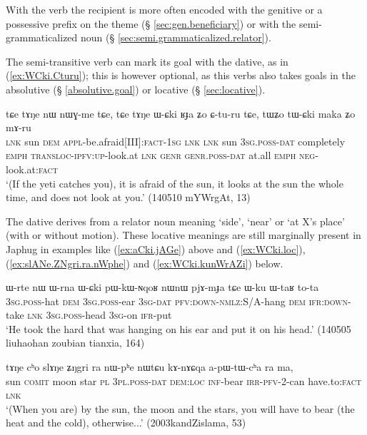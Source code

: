 With the verb  the recipient is more often encoded with the genitive or a possessive prefix on the theme (§ \ref{sec:gen.beneficiary}) or with the semi-grammaticalized noun  (§ \ref{sec:semi.grammaticalized.relator}).

 
The semi-transitive verb  can mark its goal with the dative, as in (\ref{ex:WCki.Cturu}); this is however optional, as this verbs also takes goals in the absolutive (§ \ref{absolutive.goal}) or locative (§ \ref{sec:locative}).

\begin{exe}
\ex \label{ex:WCki.Cturu}
\gll tɕe tɤŋe nɯ nɯɣ-me tɕe, tɕe tɤŋe ɯ-ɕki ʁɟa ʑo ɕ-tu-ru tɕe, tɯʑo tɯ-ɕki maka ʑo mɤ-ru \\
\textsc{lnk} sun \textsc{dem} \textsc{appl}-be.afraid[III]:\textsc{fact}-\textsc{1sg} \textsc{lnk} \textsc{lnk} sun \textsc{3sg}.\textsc{poss}-\textsc{dat} completely \textsc{emph} \textsc{transloc}-\textsc{ipfv}:\textsc{up}-look.at \textsc{lnk} \textsc{genr} \textsc{genr}.\textsc{poss}-\textsc{dat} at.all \textsc{emph} \textsc{neg}-look.at:\textsc{fact} \\
\glt `(If the yeti catches you), it is afraid of the sun, it looks at the sun the whole time, and does not look at you.' (140510 mYWrgAt, 13)
\end{exe}

The dative  derives from a relator noun meaning `side', `near' or `at X's place' (with or without motion). These locative meanings are still marginally present in Japhug in examples like (\ref{ex:aCki.jAGe}) above and (\ref{ex:WCki.loc}), (\ref{ex:slANe.ZNgri.ra.nWphe}) and (\ref{ex:WCki.kunWrAZi}) below.

\begin{exe}
\ex \label{ex:WCki.loc}
\gll  ɯ-rte nɯ ɯ-rna ɯ-ɕki pɯ-kɯ-ɴqoʁ nɯnɯ pjɤ-mɟa tɕe ɯ-ku ɯ-taʁ to-ta \\
\textsc{3sg.poss}-hat \textsc{dem} \textsc{3sg.poss}-ear \textsc{3sg}-\textsc{dat} \textsc{pfv:down-nmlz}:S/A-hang \textsc{dem} \textsc{ifr:down}-take \textsc{lnk} \textsc{3sg.poss}-head \textsc{3sg}-on \textsc{ifr}-put \\
\glt `He took the hard that was hanging on his ear and put it on his head.' (140505 liuhaohan zoubian tianxia, 164)
\end{exe}

\begin{exe}
\ex \label{ex:slANe.ZNgri.ra.nWphe}
\gll   tɤŋe cʰo slɤŋe ʑŋgri ra nɯ-pʰe nɯtɕu kɤ-nɤɕqa a-pɯ-tɯ-cʰa ra ma, \\
sun \textsc{comit} moon star \textsc{pl} \textsc{3pl}.\textsc{poss}-\textsc{dat} \textsc{dem}:\textsc{loc} \textsc{inf}-bear \textsc{irr}-\textsc{pfv}-2-can have.to:\textsc{fact} \textsc{lnk} \\
\glt `(When you are) by the sun, the moon and the stars, you will have to bear (the heat and the cold), otherwise...' (2003kandZislama, 53)
\end{exe}
 
